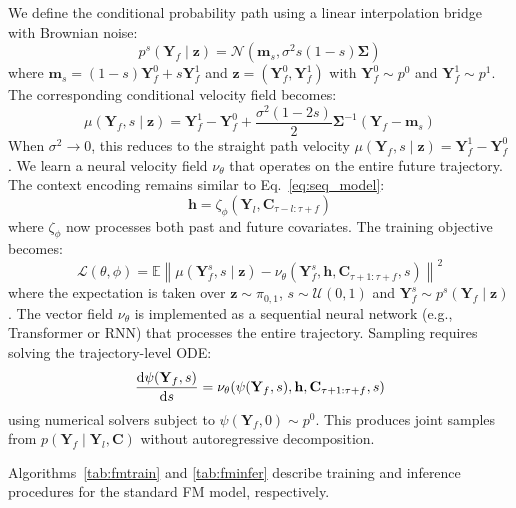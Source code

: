 \documentclass[a4paper,10pt,twocolumn,preprint,3p]{elsarticle}
\begin{document}
We define the conditional probability path using a linear interpolation bridge with Brownian noise:
\begin{equation}
    p^s(\mathbf{Y}_f \mid \mathbf{z}) = \mathcal{N}\left(\mathbf{m}_s, \sigma^2 s(1-s)\mathbf{\Sigma}\right)
\end{equation}
where $\mathbf{m}_s = (1-s)\mathbf{Y}_f^0 + s\mathbf{Y}_f^1$ and $\mathbf{z} = (\mathbf{Y}_f^0, \mathbf{Y}_f^1)$ with $\mathbf{Y}_f^0 \sim p^0$ and $\mathbf{Y}_f^1 \sim p^1$. The corresponding conditional velocity field becomes:
\begin{equation}
    \mu(\mathbf{Y}_f, s\mid\mathbf{z}) = \mathbf{Y}_f^1 - \mathbf{Y}_f^0 + \frac{\sigma^2(1-2s)}{2}\mathbf{\Sigma}^{-1}(\mathbf{Y}_f - \mathbf{m}_s)
\end{equation}
When $\sigma^2 \to 0$, this reduces to the straight path velocity $\mu(\mathbf{Y}_f,s\mid\mathbf{z}) = \mathbf{Y}_f^1 - \mathbf{Y}_f^0$.
We learn a neural velocity field $\nu_\theta$ that operates on the entire future trajectory. The context encoding remains similar to Eq.~\eqref{eq:seq_model}:
\begin{equation}
    \mathbf{h} = \zeta_\phi(\mathbf{Y}_l, \mathbf{C}_{\tau-l:\tau+f})
\end{equation}
where $\zeta_\phi$ now processes both past and future covariates. The training objective becomes:
\begin{equation}
    \mathcal{L}(\theta, \phi) = \mathbb{E} \left\| \mu(\mathbf{Y}_f^s, s\mid\mathbf{z}) - \nu_\theta(\mathbf{Y}_f^s, \mathbf{h}, \mathbf{C}_{\tau+1:\tau+f}, s) \right\|^2
\end{equation}
where the expectation is taken over $\mathbf{z} \sim \pi_{0,1}$, $s \sim \mathcal{U}(0,1)$ and $\mathbf{Y}_f^s \sim p^s(\mathbf{Y}_f\mid\mathbf{z})$. The vector field $\nu_\theta$ is implemented as a sequential neural network (e.g., Transformer or RNN) that processes the entire trajectory.
Sampling requires solving the trajectory-level ODE:
\begin{equation}
    \dv{\psi(\mathbf{Y}_f,s)}{s} = \nu_\theta(\psi(\mathbf{Y}_f,s), \mathbf{h}, \mathbf{C}_{\tau+1:\tau+f}, s)
\end{equation}
using numerical solvers subject to $\psi(\mathbf{Y}_f,0) \sim p^0$. This produces joint samples from $p(\mathbf{Y}_f\mid\mathbf{Y}_l,\mathbf{C})$ without autoregressive decomposition.

Algorithms~\ref{tab:fmtrain} and \ref{tab:fminfer} describe training and inference procedures for the standard FM model, respectively.
\end{document}
